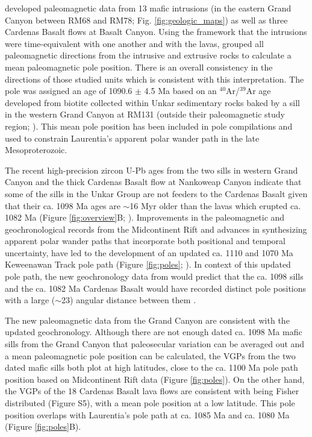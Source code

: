 \cite{Weil2003a} developed paleomagnetic data from 13 mafic intrusions (in the eastern Grand Canyon between RM68 and RM78; Fig. \ref{fig:geologic_maps}) as well as three Cardenas Basalt flows at Basalt Canyon. Using the framework that the intrusions were time-equivalent with one another and with the lavas, \cite{Weil2003a} grouped all paleomagnetic directions from the intrusive and extrusive rocks to calculate a mean paleomagnetic pole position. There is an overall consistency in the directions of those studied units which is consistent with this interpretation. The pole was assigned an age of 1090.6 $\pm$ 4.5 Ma based on an $^{40}$Ar/$^{39}$Ar age developed from biotite collected within Unkar sedimentary rocks baked by a sill in the western Grand Canyon at RM131 (outside their paleomagnetic study region; \cite{Weil2003a}). This mean pole position has been included in pole compilations \cite[e.g.][]{Evans2021a} and used to constrain Laurentia's apparent polar wander path in the late Mesoproterozoic. 

The recent high-precision zircon U-Pb ages from the two sills in western Grand Canyon and the thick Cardenas Basalt flow at Nankoweap Canyon indicate that some of the sills in the Unkar Group are not feeders to the Cardenas Basalt given that their ca. 1098 Ma ages are $\sim$16 Myr older than the lavas which erupted ca. 1082 Ma (Figure \ref{fig:overview}B; \cite{Mohr2024a}). Improvements in the paleomagnetic and geochronological records from the Midcontinent Rift \cite[e.g.][]{Tauxe2009a, Kulakov2013b, Fairchild2017a, Swanson-Hysell2019a} and advances in synthesizing apparent polar wander paths that incorporate both positional and temporal uncertainty, have led to the development of an updated ca. 1110 and 1070 Ma Keweenawan Track pole path (Figure \ref{fig:poles}; \cite{Swanson-Hysell2019a, Rose2022a}). In context of this updated pole path, the new geochronology data from \cite{Mohr2024a} would predict that the ca. 1098 sills and the ca. 1082 Ma Cardenas Basalt would have recorded distinct pole positions with a large ($\sim$23\textdegree) angular distance between them \citep{Swanson-Hysell2019a, Rose2022a}. 

The new paleomagnetic data from the Grand Canyon are consistent with the updated geochronology. Although there are not enough dated ca. 1098 Ma mafic sills from the Grand Canyon that paleosecular variation can be averaged out and a mean paleomagnetic pole position can be calculated, the VGPs from the two dated mafic sills both plot at high latitudes, close to the ca. 1100 Ma pole path position based on Midcontinent Rift data (Figure \ref{fig:poles}). On the other hand, the VGPs of the 18 Cardenas Basalt lava flows are consistent with being Fisher distributed (Figure S5), with a mean pole position at a low latitude. This pole position overlaps with Laurentia's pole path at ca. 1085 Ma and ca. 1080 Ma (Figure \ref{fig:poles}B). 

